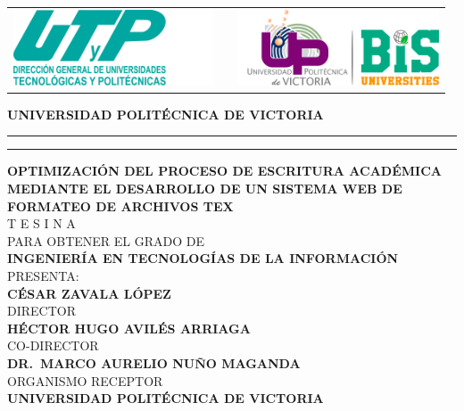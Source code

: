 \documentclass[12pt]{article}
\date{\specialdate\today}
\newcommand{\HRule}{\rule{\linewidth}{0.25mm}}
\newcommand{\ncarrera}{Ingeniería en Tecnologías de la Información}
\newcommand{\nasesorinstitucional}{Héctor Hugo Avilés Arriaga}
\newcommand{\NombreAlumno}{César Zavala López}
\newcommand{\NombreProyecto}{Optimización del Proceso de Escritura Académica mediante el Desarrollo de un Sistema Web de Formateo de Archivos TeX}
\newcommand{\organismoreceptor}{Universidad Politécnica de Victoria}
\newcommand{\nasesorempresaria}{Dr.\ Marco Aurelio Nuño Maganda}
\newcommand{\separacionCorta}{0.0cm}
\newcommand{\separacionLarga}{0.5cm}
\newcommand{\iemph}[1]{\MakeTextUppercase{#1}}
\begin{document}
\setcounter{page}{1}
\thispagestyle{empty}

\begin{center}

\begin{tabular}{cp{3.5cm}c}
\includegraphics[height=2.25cm]{LOGOS/UTyP-LOGO.png} & 
& \includegraphics[height=2.25cm]{LOGOS/UPV-LOGO.png}   \\
\end{tabular}

\Large \textbf{UNIVERSIDAD POLITÉCNICA DE VICTORIA}
\vspace{0.5cm}
\hrule
\vspace{0.1cm} 
\hrule
\vspace{0.5cm}


\textbf{\iemph{\NombreProyecto}} \\[\separacionLarga]
T E S I N A \\
PARA OBTENER EL GRADO DE \\
\textbf{\iemph{\ncarrera}} \\[\separacionLarga]

PRESENTA:\\[\separacionCorta]
\textbf{\iemph{\NombreAlumno}}\\[\separacionLarga]


DIRECTOR \\[\separacionCorta]
\textbf{\iemph{\nasesorinstitucional}} \\[\separacionLarga]

CO-DIRECTOR \\[\separacionCorta]
\textbf{\iemph{\nasesorempresaria}} \\[\separacionLarga]

ORGANISMO RECEPTOR \\[\separacionCorta]
\textbf{\iemph{\organismoreceptor}} \\[\separacionLarga]

\end{center}
\end{document}
